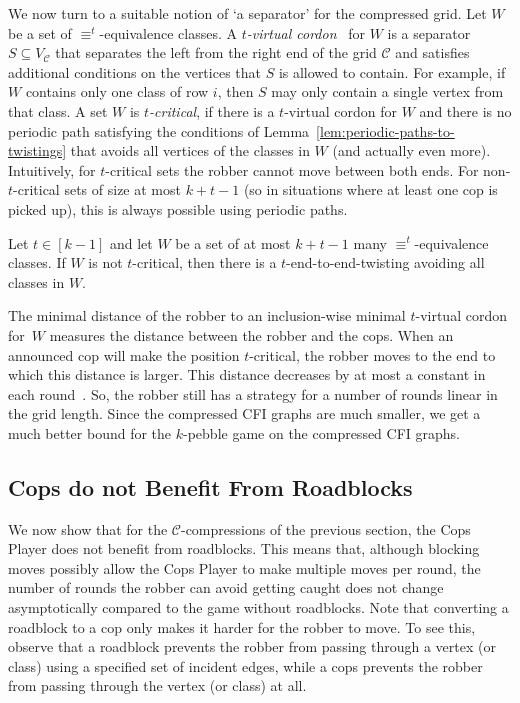 \documentclass[a4paper,english, thm-restate]{lipics-v2021}
\newcommand{\defining}[1]{\emph{#1}}
\newcommand{\comp}{\equiv}
\newcommand{\grid}{\mathcal{C}}
\newcommand{\vertexC}{V_{\mathcal{C}}}
\begin{document}
\noindent We now turn to a suitable notion of `a separator' for the compressed grid.
Let $W$ be a set of $\comp^t$-equivalence classes.
A \defining{$t$-virtual cordon}~\cite{RFJN024} for $W$
is a separator $S \subseteq \vertexC$ that separates the left from the right end of the grid $\grid$ and satisfies additional conditions on the vertices that $S$ is allowed to contain. For example, if $W$ contains only one class of row $i$, then $S$ may only contain a single vertex from that class.
A set $W$ is \defining{$t$-critical}, if there is a $t$-virtual cordon for $W$
and there is no periodic path satisfying the conditions of Lemma~\ref{lem:periodic-paths-to-twistings} that avoids all vertices of the classes in $W$ (and actually even more).
Intuitively, for $t$-critical sets the robber cannot move between both ends. For non-$t$-critical sets of size at most $k+t-1$ (so in situations where at least one cop is picked up), this is always possible using periodic paths.
\begin{lemma}
        \label{lem:compressed-non-blocking-strategy}
        Let $t \in [k-1]$ and let $W$ be a set of at most $k+t-1$ many $\comp^t$-equivalence classes. 
        If $W$ is not $t$-critical,
        then there is a $t$-end-to-end-twisting avoiding all classes in $W$.
\end{lemma}
The minimal distance of the robber
to an inclusion-wise minimal $t$-virtual cordon for~$W$ measures the distance between the robber and the cops.
When an announced cop will make the position $t$-critical, the robber moves to the end to which this distance is larger.
This distance decreases by at most a constant in each round~\cite{RFJN024}.
So, the robber still has a strategy for a number of rounds linear in the grid length.
Since the compressed CFI graphs are much smaller,
we get a much better bound for the $k$-pebble game on the compressed CFI graphs. 

\subsection{Cops do not Benefit From Roadblocks}
We now show that for the $\grid$-compressions of the previous section,
the Cops Player does not benefit from roadblocks.
This means that, although blocking moves 
%
 possibly allow the Cops Player to make multiple moves
per round,
the number of rounds the robber can avoid getting caught does not 
change asymptotically compared to the game without roadblocks.
%
%
%
%
%
Note that converting a roadblock to a cop only makes it harder for the robber to move. To see this, observe that a roadblock prevents the robber from passing through a vertex (or class)
using a specified set of incident edges, while
 a cops prevents the robber from passing through the vertex (or class) at all.
\end{document}
